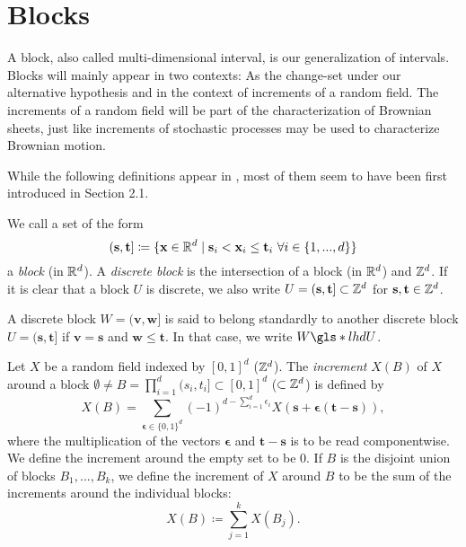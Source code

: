 \section{Blocks}

A block, also called multi-dimensional interval, is our generalization of intervals. Blocks will mainly appear in two contexts: As the change-set under our alternative hypothesis and in the context of increments of a random field. The increments of a random field will be part of the characterization of Brownian sheets, just like increments of stochastic processes may be used to characterize Brownian motion.

While the following definitions appear in \cite{[0]BUCCHIA2017344}, most of them seem to have been first introduced in \cite{[11]bulinksi2007limittheorems} Section 2.1.

\begin{defn}[Blocks]
    We call a set of the form 
    \[ (\mathbf{s}, \mathbf{t}] \coloneqq \{ \mathbf{x} \in \mathbb{R}^d \mid \mathbf{s}_i < \mathbf{x}_i \leq \mathbf{t}_i \ \forall i \in \{1, ..., d\} \} \]
    a \textit{block} (in $\mathbb{R}^d$). A \textit{discrete block} is the intersection of a block (in $\mathbb{R}^d$) and $\mathbb{Z}^d$. If it is clear that a block $U$ is discrete, we also write $U = (\mathbf{s}, \mathbf{t}] \subset \mathbb{Z}^d$ for $\mathbf{s}, \mathbf{t} \in \mathbb{Z}^d$.
\end{defn}

\begin{defn}
    A discrete block $W = (\mathbf{v}, \mathbf{w}]$ is said to belong standardly to another discrete block $U = (\mathbf{s}, \mathbf{t}]$ if $\mathbf{v} = \mathbf{s}$ and $\mathbf{w} \leq \mathbf{t}$. In that case, we write $W \gls*{lhd} U$.
\end{defn}

\begin{defn}[Increment]
    Let $X$ be a random field indexed by $[0, 1]^d$ ($\mathbb{Z}^d$).
    The \textit{increment} $X(B)$ of $X$ around a block $\emptyset \neq B = \prod_{i=1}^d (s_i, t_i] \subset [0, 1]^d$ ($\subset \mathbb{Z}^d$) is defined by
    \[ X(B) = \sum\limits_{{\boldsymbol{\epsilon}} \in \{0, 1\}^d} (-1)^{d-\sum\limits_{i=1}^d \epsilon_i} X(\mathbf{s} + {\boldsymbol{\epsilon}} (\mathbf{t} - \mathbf{s})), \]
    where the multiplication of the vectors ${\boldsymbol{\epsilon}}$ and $\mathbf{t} - \mathbf{s}$ is to be read componentwise. We define the increment around the empty set to be $0$. If $B$ is the disjoint union of blocks $B_1, ..., B_k$, we define the increment of $X$ around $B$ to be the sum of the increments around the individual blocks:
    \[ X(B) \coloneqq \sum\limits_{j=1}^k X(B_j). \]
\end{defn}

